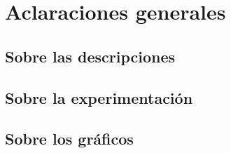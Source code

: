 \section{Aclaraciones generales}

\subsection{Sobre las descripciones}


\subsection{Sobre la experimentaci\'on}


 
\subsection{Sobre los gr\'{a}ficos}



